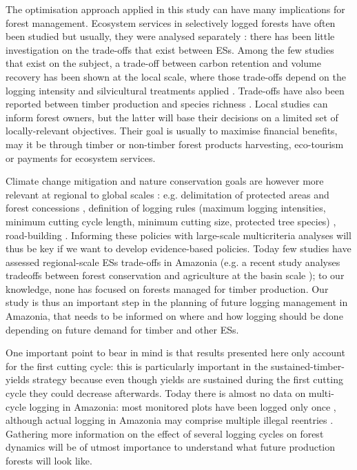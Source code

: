 \documentclass{article}
\begin{document}
The optimisation approach applied in this study can have many implications for forest management. Ecosystem services in selectively logged forests have often been studied but usually, they were analysed separately \cite{Putz2012}: there has been little investigation on the trade-offs that exist between ESs. Among the few studies that exist on the subject, a trade-off between carbon retention and volume recovery has been shown at the local scale, where those trade-offs depend on the logging intensity and silvicultural treatments applied \cite{Roopsind2018}. Trade-offs have also been reported between timber production and species richness \cite{Burivalova2014}.  
Local studies can inform forest owners, but the latter will base their decisions on a limited set of locally-relevant objectives. Their goal is usually to maximise financial benefits, may it be through timber or non-timber forest products harvesting, eco-tourism or payments for ecosystem services. 

Climate change mitigation and nature conservation goals are however more relevant at regional to global scales \cite{Hein2006b}: e.g. delimitation of protected areas and forest concessions \cite{Verissimo2002}, definition of logging rules (maximum logging intensities, minimum cutting cycle length, minimum cutting size, protected tree species) \cite{Blaser2011}, road-building \cite{Laurance2014}. Informing these policies with large-scale multicriteria analyses will thus be key if we want to develop evidence-based policies. Today few studies have assessed regional-scale ESs trade-offs in Amazonia (e.g. a recent study analyses tradeoffs between forest conservation and agriculture at the basin scale \cite{OConnell2018}); to our knowledge, none has focused on forests managed for timber production. Our study is thus an important step in the planning of future logging management in Amazonia, that needs to be informed on where and how logging should be done depending on future demand for timber and other ESs. 

One important point to bear in mind is that results presented here only account for the first cutting cycle: this is particularly important in the sustained-timber-yields strategy because even though yields are sustained during the first cutting cycle they could decrease afterwards. Today there is almost no data on multi-cycle logging in Amazonia: most monitored plots have been logged only once \cite{Sist2015}, although actual logging in Amazonia may comprise multiple illegal reentries \cite{Tritsch2016a}. Gathering more information on the effect of several logging cycles on forest dynamics will be of utmost importance to understand what future production forests will look like. 
\end{document}
